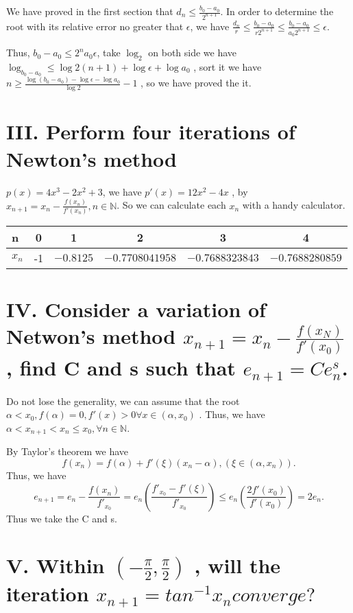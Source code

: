 \documentclass[twoside,a4paper]{article}
\begin{document}
We have proved in the first section that 
$d_{n}\le \frac{b_0-a_0}{2^{n+1}}$. In order to determine the root with its relative error no greater that $\epsilon$, 
we have $\frac{d_{n}}{r}\le \frac{b_0-a_0}{r2^{n+1}}\le \frac{b_0-a_{0}}{a_{0}2^{n+1}}\le \epsilon$.

Thus, $b_0-a_0\le 2^{n}a_0\epsilon$, 
take $\log_2$ on both side we have $\log_{b_0-a_0}\le \log 2(n+1)+\log\epsilon+\log a_0$
, sort it we have $n\ge \frac{\log\left(b_0-a_0\right)-\log\epsilon-\log a_0 }{\log 2}-1$ 
, so we have proved the it.


\section*{III. \small{Perform four iterations of Newton's method}}

$p\left( x \right)=4x^3-2x^2+3$, we have $p'\left( x \right) =12x^2-4x$
, by $x_{n+1}=x_{n}-\frac{f\left( x_{n}\right) }{f'\left( x_{n} \right) }
, n\in\mathbb{N}$. 
So we can calculate each $x_{n}$ with a handy calculator. 

\begin{tabular}{|l|c|c|c|c|c|}
\hline
n&0&1&2&3&4\\
\hline
$x_{n}$ &-1&$-0.8125$ &$-0.7708041958$&$-0.7688323843$&$-0.7688280859$\\
\hline 
\end{tabular}

\section*{IV. \small{Consider a variation of Netwon's method $x_{n+1}=x_{n}-\frac{f\left( x_{N} \right) }{f'\left( x_0\right) }$
, find C and s such that $e_{n+1}=Ce_{n}^{s}$.}}

Do not lose the generality, we can assume that the root $\alpha<x_0
, f\left(  \alpha\right)=0, f'\left( x\right)>0 \forall x\in \left( \alpha,x_0\right) $ .
Thus, we have $\alpha<x_{n+1}< x_{n}\le x_0, \forall n\in\mathbb{N}$.	

By Taylor's theorem we have
 \[
	 f\left( x_{n} \right)=f\left( \alpha \right)+
	 f'\left(  \xi\right)\left( x_{n}-\alpha \right) 
	 ,\left(  \xi\in\left(  \alpha,x_{n}\right) \right)  
 .\] 
Thus, we have
\[
	e_{n+1}=e_{n}-\frac{f\left( x_{n} \right) }{f'_{x_0}}=
	e_{n}\left(  \frac{f'_{x_0}-f'\left( \xi \right) }{f'_{x_0}}\right)
	\le e_{n}\left(  \frac{2f'\left( x_0 \right) }{f'\left( x_0 \right) }\right) 
	=2e_{n}
.\] 
Thus we take the C and s.
\section*{V. \small{Within $\left( -\frac{\pi}{2},\frac{\pi}{2}\right) $
, will the iteration $x_{n+1}=tan^{-1}x_{n} converge?$}}
\end{document}
